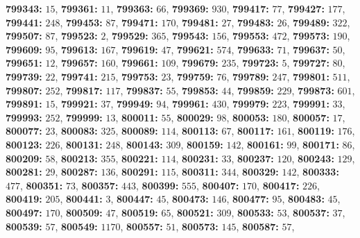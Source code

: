 \textsf{\bfseries 799343:} $15$, \textsf{\bfseries 799361:} $11$, \textsf{\bfseries 799363:} $66$, \textsf{\bfseries 799369:} $930$, \textsf{\bfseries 799417:} $77$, \textsf{\bfseries 799427:} $177$, \textsf{\bfseries 799441:} $248$, \textsf{\bfseries 799453:} $87$, \textsf{\bfseries 799471:} $170$, \textsf{\bfseries 799481:} $27$, \textsf{\bfseries 799483:} $26$, \textsf{\bfseries 799489:} $322$, \textsf{\bfseries 799507:} $87$, \textsf{\bfseries 799523:} $2$, \textsf{\bfseries 799529:} $365$, \textsf{\bfseries 799543:} $156$, \textsf{\bfseries 799553:} $472$, \textsf{\bfseries 799573:} $190$, \textsf{\bfseries 799609:} $95$, \textsf{\bfseries 799613:} $167$, \textsf{\bfseries 799619:} $47$, \textsf{\bfseries 799621:} $574$, \textsf{\bfseries 799633:} $71$, \textsf{\bfseries 799637:} $50$, \textsf{\bfseries 799651:} $12$, \textsf{\bfseries 799657:} $160$, \textsf{\bfseries 799661:} $109$, \textsf{\bfseries 799679:} $235$, \textsf{\bfseries 799723:} $5$, \textsf{\bfseries 799727:} $80$, \textsf{\bfseries 799739:} $22$, \textsf{\bfseries 799741:} $215$, \textsf{\bfseries 799753:} $23$, \textsf{\bfseries 799759:} $76$, \textsf{\bfseries 799789:} $247$, \textsf{\bfseries 799801:} $511$, \textsf{\bfseries 799807:} $252$, \textsf{\bfseries 799817:} $117$, \textsf{\bfseries 799837:} $55$, \textsf{\bfseries 799853:} $44$, \textsf{\bfseries 799859:} $229$, \textsf{\bfseries 799873:} $601$, \textsf{\bfseries 799891:} $15$, \textsf{\bfseries 799921:} $37$, \textsf{\bfseries 799949:} $94$, \textsf{\bfseries 799961:} $430$, \textsf{\bfseries 799979:} $223$, \textsf{\bfseries 799991:} $33$, \textsf{\bfseries 799993:} $252$, \textsf{\bfseries 799999:} $13$, \textsf{\bfseries 800011:} $55$, \textsf{\bfseries 800029:} $98$, \textsf{\bfseries 800053:} $180$, \textsf{\bfseries 800057:} $17$, \textsf{\bfseries 800077:} $23$, \textsf{\bfseries 800083:} $325$, \textsf{\bfseries 800089:} $114$, \textsf{\bfseries 800113:} $67$, \textsf{\bfseries 800117:} $161$, \textsf{\bfseries 800119:} $176$, \textsf{\bfseries 800123:} $226$, \textsf{\bfseries 800131:} $248$, \textsf{\bfseries 800143:} $309$, \textsf{\bfseries 800159:} $142$, \textsf{\bfseries 800161:} $99$, \textsf{\bfseries 800171:} $86$, \textsf{\bfseries 800209:} $58$, \textsf{\bfseries 800213:} $355$, \textsf{\bfseries 800221:} $114$, \textsf{\bfseries 800231:} $33$, \textsf{\bfseries 800237:} $120$, \textsf{\bfseries 800243:} $129$, \textsf{\bfseries 800281:} $29$, \textsf{\bfseries 800287:} $136$, \textsf{\bfseries 800291:} $115$, \textsf{\bfseries 800311:} $344$, \textsf{\bfseries 800329:} $142$, \textsf{\bfseries 800333:} $477$, \textsf{\bfseries 800351:} $73$, \textsf{\bfseries 800357:} $443$, \textsf{\bfseries 800399:} $555$, \textsf{\bfseries 800407:} $170$, \textsf{\bfseries 800417:} $226$, \textsf{\bfseries 800419:} $205$, \textsf{\bfseries 800441:} $3$, \textsf{\bfseries 800447:} $45$, \textsf{\bfseries 800473:} $146$, \textsf{\bfseries 800477:} $95$, \textsf{\bfseries 800483:} $45$, \textsf{\bfseries 800497:} $170$, \textsf{\bfseries 800509:} $47$, \textsf{\bfseries 800519:} $65$, \textsf{\bfseries 800521:} $309$, \textsf{\bfseries 800533:} $53$, \textsf{\bfseries 800537:} $37$, \textsf{\bfseries 800539:} $57$, \textsf{\bfseries 800549:} $1170$, \textsf{\bfseries 800557:} $51$, \textsf{\bfseries 800573:} $145$, \textsf{\bfseries 800587:} $57$, 
